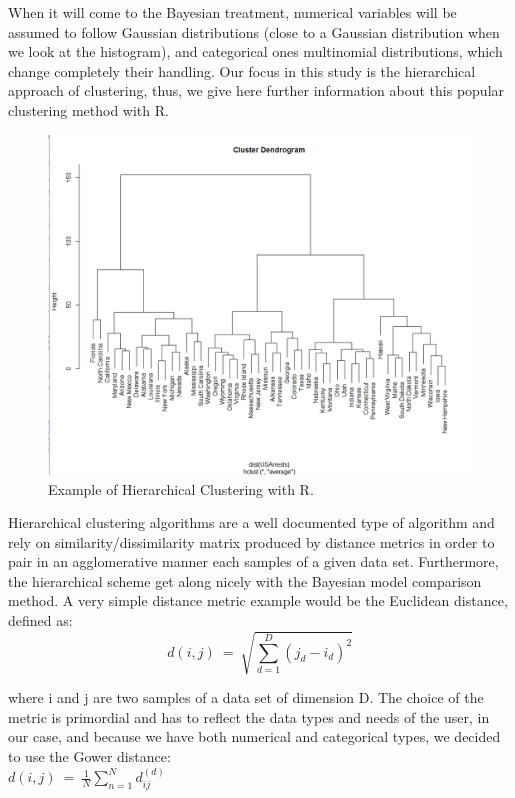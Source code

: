 \documentclass[twocolumn]{article}
\begin{document}
When it will come to the Bayesian treatment, numerical variables will be assumed to follow Gaussian distributions (close to a Gaussian distribution when we look at the histogram), and categorical ones multinomial distributions, which change completely their handling.
Our focus in this study is the hierarchical approach of clustering, thus, we give here further information about this popular clustering method with R.
\begin{figure}
    \centering
    \includegraphics[scale=0.2]{img/HC.png}
    \caption{Example of Hierarchical Clustering with R.}
    \label{fig:HC}
\end{figure}
Hierarchical clustering algorithms are a well documented type of algorithm and rely on similarity/dissimilarity matrix produced by distance metrics in order to pair in an agglomerative manner each samples of a given data set.
Furthermore, the hierarchical scheme get along nicely with the Bayesian model comparison method.
A very simple distance metric example would be the Euclidean distance, defined as:\\
$$d(i,j)\ =\ \sqrt{\sum_{d=1}^D(j_d-i_d)^2}$$


where i and j are two samples of a data set of dimension D.
The choice of the metric is primordial and has to reflect the data types and needs of the user, in our case, and because we have both numerical and categorical types, we decided to use the Gower distance:\\
$d(i,j)\ =\ \frac{1}{N}\sum_{n=1}^Nd_{ij}^{(d)}$\\
\end{document}
